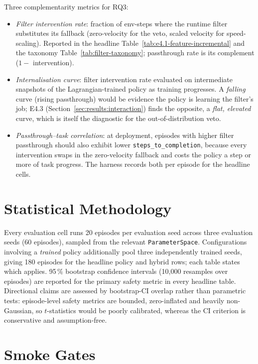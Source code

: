 \documentclass[11pt,a4paper]{report}
\begin{document}
Three complementarity metrics for RQ3:
\begin{itemize}[topsep=2pt,itemsep=1pt]
\item \emph{Filter intervention rate}: fraction of env-steps where
  the runtime filter substitutes its fallback (zero-velocity for the
  veto, scaled velocity for speed-scaling). Reported in the headline
  Table~\ref{tab:e4.1-feature-incremental} and the taxonomy
  Table~\ref{tab:filter-taxonomy}; passthrough rate is its complement
  ($1 -$ intervention).
\item \emph{Internalisation curve}: filter intervention rate
  evaluated on intermediate snapshots of the Lagrangian-trained
  policy as training progresses. A \emph{falling} curve (rising
  passthrough) would be evidence the policy is learning the filter's
  job; E4.3 (Section~\ref{sec:results:interaction}) finds the opposite,
  a \emph{flat, elevated} curve, which is itself the diagnostic for the
  out-of-distribution veto.
\item \emph{Passthrough--task correlation}: at deployment, episodes
  with higher filter passthrough should also exhibit lower
  \texttt{steps\_to\_completion}, because every intervention swaps
  in the zero-velocity fallback and costs the policy a step or
  more of task progress. The harness records both per episode for
  the headline cells.
\end{itemize}

\section{Statistical Methodology}
\label{sec:setup:stats}

Every evaluation cell runs 20 episodes per evaluation seed across
three evaluation seeds (60 episodes), sampled from the relevant
\texttt{ParameterSpace}. Configurations involving a \emph{trained}
policy additionally pool three independently trained seeds, giving
180 episodes for the headline policy and hybrid rows; each table
states which applies. 95\,\% bootstrap confidence intervals
(10{,}000 resamples over episodes) are reported for the primary
safety metric in every headline table. Directional claims are
assessed by bootstrap-CI overlap rather than parametric tests:
episode-level safety metrics are bounded, zero-inflated and heavily
non-Gaussian, so $t$-statistics would be poorly calibrated, whereas
the CI criterion is conservative and assumption-free.

\section{Smoke Gates}
\label{sec:setup:smoke}
\end{document}

